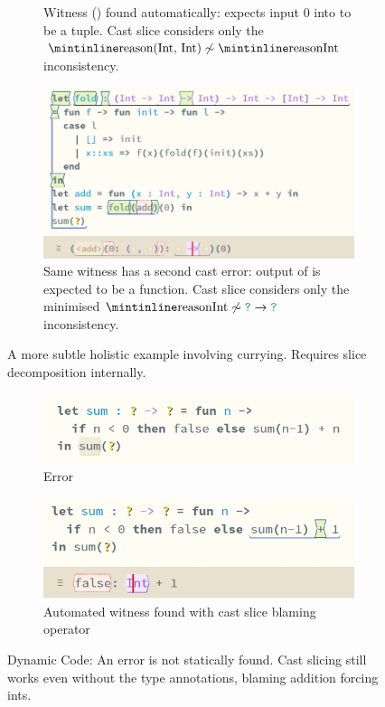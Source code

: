 \begin{figure}[h]
\begin{subfigure}{0.49\textwidth}
\caption{Witness (\code{[0]}) found automatically: expects input $0$ into  to be a tuple. Cast slice considers only the $\code{(Int, Int)} \not\sim \code{Int}$ inconsistency.}
\end{subfigure}
\begin{subfigure}{0.49\textwidth}
\includegraphics[width=1\textwidth]{Media/Figures/curries_expects_function}
\caption{Same witness has a second cast error: output of  is expected to be a function. Cast slice considers only the minimised $\code{Int} \not\sim {\dyn \to \dyn}$ inconsistency.}
\end{subfigure}
\caption{A more subtle holistic example involving currying. Requires slice decomposition internally.}
\label{fig:TastyCurry}
\end{figure}

\begin{figure}[h]
\centering
\begin{subfigure}{0.45\textwidth}
\includegraphics[width=1\textwidth]{Media/Figures/dynamic_code_error}
\caption{Error}
\end{subfigure}
\begin{subfigure}{0.45\textwidth}
\includegraphics[width=1\textwidth]{Media/Figures/dynamic_code_error_cast_slice}
\caption{Automated witness found with cast slice blaming \code{+} operator}
\end{subfigure}
\caption{Dynamic Code: An error is not statically found. Cast slicing still works even without the type annotations, blaming addition forcing ints.}
\label{fig:DynamicExample}
\end{figure}